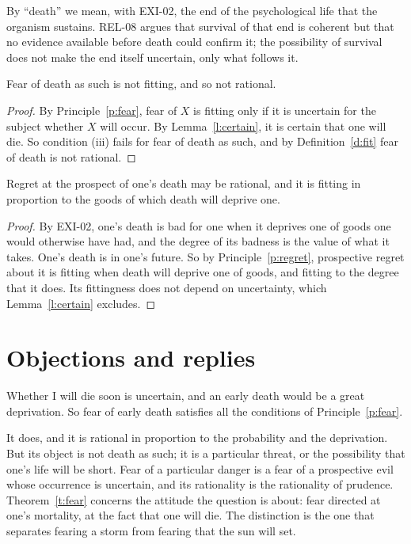 \documentclass{situationist-preprint}
\begin{document}
By \enquote{death} we mean, with EXI-02, the end of the psychological life that the organism sustains. REL-08 argues that survival of that end is coherent but that no evidence available before death could confirm it; the possibility of survival does not make the end itself uncertain, only what follows it.

\begin{theorem}\label{t:fear}
Fear of death as such is not fitting, and so not rational.
\end{theorem}

\begin{proof}
By Principle~\ref{p:fear}, fear of $X$ is fitting only if it is uncertain for the subject whether $X$ will occur. By Lemma~\ref{l:certain}, it is certain that one will die. So condition (iii) fails for fear of death as such, and by Definition~\ref{d:fit} fear of death is not rational.
\end{proof}

\begin{theorem}\label{t:regret}
Regret at the prospect of one's death may be rational, and it is fitting in proportion to the goods of which death will deprive one.
\end{theorem}

\begin{proof}
By EXI-02, one's death is bad for one when it deprives one of goods one would otherwise have had, and the degree of its badness is the value of what it takes. One's death is in one's future. So by Principle~\ref{p:regret}, prospective regret about it is fitting when death will deprive one of goods, and fitting to the degree that it does. Its fittingness does not depend on uncertainty, which Lemma~\ref{l:certain} excludes.
\end{proof}

\section{Objections and replies}

\begin{objection}\label{o:early}
Whether I will die soon is uncertain, and an early death would be a great deprivation. So fear of early death satisfies all the conditions of Principle~\ref{p:fear}.
\end{objection}

\begin{reply}
It does, and it is rational in proportion to the probability and the deprivation. But its object is not death as such; it is a particular threat, or the possibility that one's life will be short. Fear of a particular danger is a fear of a prospective evil whose occurrence is uncertain, and its rationality is the rationality of prudence. Theorem~\ref{t:fear} concerns the attitude the question is about: fear directed at one's mortality, at the fact that one will die. The distinction is the one that separates fearing a storm from fearing that the sun will set.
\end{reply}
\end{document}
